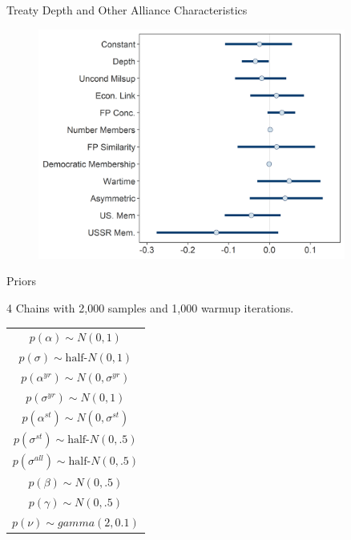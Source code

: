 \documentclass[12pt]{beamer}
\begin{document}

\begin{frame}{Treaty Depth and Other Alliance Characteristics}

\begin{figure}
	\centering
		\includegraphics[width=0.9\textwidth]{beta-intervals-min.png}
	\label{fig:beta-intervals-min}
\end{figure}


\end{frame}



\begin{frame}{Priors}

4 Chains with 2,000 samples and 1,000 warmup iterations. 

\begin{table} %

 \begin{center}
\begin{tabular}{c} 
$ p(\alpha) \sim N(0, 1)$  \\
$ p(\sigma) \sim \mbox{half-}N(0, 1) $ \\
$ p(\alpha^{yr}) \sim N(0, \sigma^{yr}) $ \\ 
$ p(\sigma^{yr}) \sim N(0, 1) $ \\
$ p(\alpha^{st}) \sim N(0, \sigma^{st}) $ \\ 
$ p(\sigma^{st}) \sim \mbox{half-}N(0, .5) $ \\ 
$ p(\sigma^{all}) \sim \mbox{half-}N(0, .5) $ \\
$ p(\beta) \sim N(0, .5) $ \\
$ p(\gamma) \sim N(0, .5) $ \\ 
$ p(\nu) \sim gamma(2, 0.1)$ 
\end{tabular} 
\end{center} 
\label{tab:priors}
\end{table} 


\end{frame}
\end{document}
